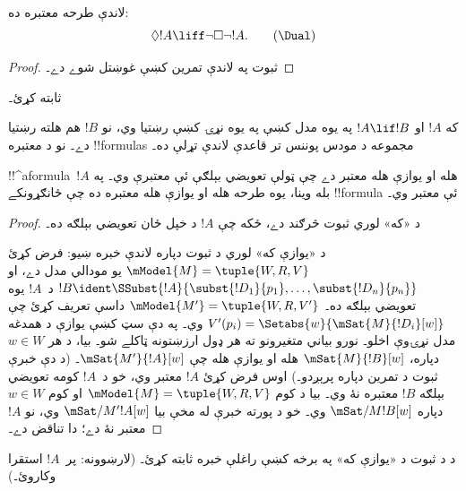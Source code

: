 \documentclass[../../../include/open-logic-section]{subfiles}
\begin{document}
\begin{prop}
  لاندې \Dual{} طرحه معتبره ده:
  \begin{equation*}
  \Diamond !A \liff \lnot\Box\lnot !A. \tag{\Dual}
  \end{equation*}
\end{prop}

\begin{proof}
  ثبوت په لاندې تمرين کښې غوښتل شوے دے۔
\end{proof}

\begin{prob}
   ثابته کړئ۔
\end{prob}

\begin{prop}
  که $!A$ او $!A \lif !B$ په يوه مدل کښې په يوه نړۍ کښې رښتيا وي،
  نو $!B$ هم هلته رښتيا دے۔ نو د معتبره !!{formula}s مجموعه د
  مودس پوننس تر قاعدې لاندې تړلې ده۔
\end{prop}

\begin{prop}
  !!^a{formula}~$!A$ هله او يوازې هله معتبر دے چې ټولې تعويضي
  بېلګې ئې معتبرې وي۔ په بله وينا، يوه طرحه هله او يوازې هله معتبره
  ده چې ځانګړونکے !!{formula} ئې معتبر وي۔
\end{prop}

\begin{proof}
  د «که» لوري ثبوت څرګند دے، ځکه چې $!A$ د خپل ځان تعويضي بېلګه ده۔

  د «يوازې که» لوري د ثبوت دپاره لاندې خبره ښيو: فرض کړئ
  $\mModel{M} = \tuple{W, R, V}$ يو مودالي مدل دے، او
  $!B \ident \SSubst{!A}{\subst{!D_1}{p_1},\dots,\subst{!D_n}{p_n}}$
  د~$!A$ يوه تعويضي بېلګه ده۔ $\mModel{M'} = \tuple{W, R,
    V'}$ داسې تعريف کړئ چې
  $V'(p_i) = \Setabs{w}{\mSat{M}{!D_i}[w]}$ وي۔ په دې سټ کښې
  يوازې د همدغه مدل نړۍوې اخلو۔ نورو بياني متغيرونو ته هر ډول ارزښتونه
  ټاکلے شو۔ بيا، د هر
  $w \in W$ دپاره، $\mSat{M}{!B}[w]$ هله او يوازې هله چې
  $\mSat{M'}{!A}[w]$۔ (د دې خبرې ثبوت د تمرين دپاره پرېږدو۔)
  اوس فرض کړئ $!A$ معتبر وي، خو د~$!A$ کومه تعويضي بېلګه $!B$
  معتبره نۀ وي۔ بيا د کوم $\mModel{M} = \tuple{W, R, V}$ او کوم
  $w \in W$ دپاره $\mSat/{M}{!B}[w]$ وي۔ خو د پورته خبرې له مخې
  بيا $\mSat/{M'}{!A}[w]$ وي، نو $!A$ معتبر نۀ دے؛ دا تناقض دے۔
\end{proof}

\begin{prob}
  د  د ثبوت د «يوازې که»
  په برخه کښې راغلې خبره ثابته کړئ۔ (لارښوونه: پر~$!A$ استقرا وکاروئ۔)
\end{prob}
\end{document}

